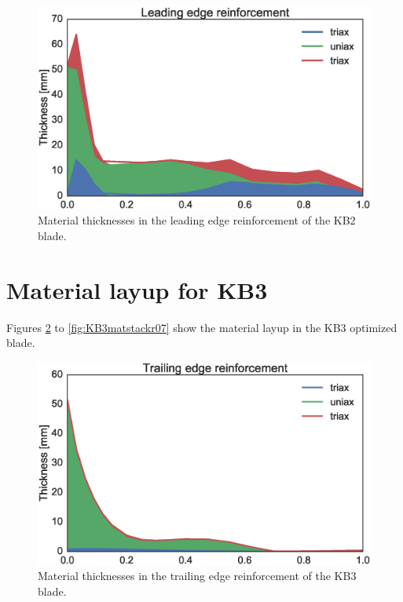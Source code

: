 \begin{figure}[pth]
\begin{center}
	\includegraphics[width=.85\linewidth]{figures/KB2_region07.eps}
\end{center}
\caption{Material thicknesses in the leading edge reinforcement of the KB2 blade.}
\label{fig:KB2matstackr07}
\end{figure}
\section{Material layup for KB3}
Figures \ref{fig:KB3matstackr01} to \ref{fig:KB3matstackr07} show the material layup in the KB3 optimized blade.

\begin{figure}[pth]
\begin{center}
	\includegraphics[width=.85\linewidth]{figures/KB3_region01.eps}
\end{center}
\caption{Material thicknesses in the trailing edge reinforcement of the KB3 blade.}
\label{fig:KB3matstackr01}
\end{figure}

